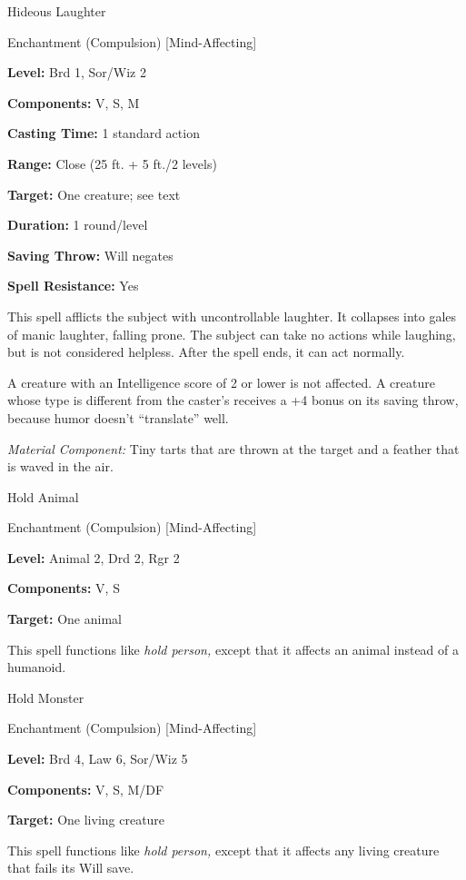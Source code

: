\documentclass{article}
\begin{document}
\vspace{12pt}
Hideous Laughter

Enchantment (Compulsion) [Mind-Affecting]

\textbf{Level:} Brd 1, Sor/Wiz 2

\textbf{Components:} V, S, M

\textbf{Casting Time:} 1 standard action

\textbf{Range:} Close (25 ft. + 5 ft./2 levels)

\textbf{Target:} One creature; see text

\textbf{Duration:} 1 round/level

\textbf{Saving Throw: }Will negates

\textbf{Spell Resistance:} Yes

This spell afflicts the subject with uncontrollable laughter. It collapses into 
gales of manic laughter, falling prone. The subject can take no actions while laughing, 
but is not considered helpless. After the spell ends, it can act normally.

A creature with an Intelligence score of 2 or lower is not affected. A creature 
whose type is different from the caster's receives a +4 bonus on its saving throw, 
because humor doesn't ``translate'' well.

\textit{Material Component: }Tiny tarts that are thrown at the target and a feather 
that is waved in the air.

\vspace{12pt}
Hold Animal

Enchantment (Compulsion) [Mind-Affecting]

\textbf{Level:} Animal 2, Drd 2, Rgr 2

\textbf{Components:} V, S

\textbf{Target:} One animal

This spell functions like \textit{hold person, }except that it affects an animal 
instead of a humanoid.

\vspace{12pt}
Hold Monster

Enchantment (Compulsion) [Mind-Affecting]

\textbf{Level:} Brd 4, Law 6, Sor/Wiz 5

\textbf{Components:} V, S, M/DF

\textbf{Target:} One living creature

This spell functions like \textit{hold person, }except that it affects any living 
creature that fails its Will save.
\end{document}

